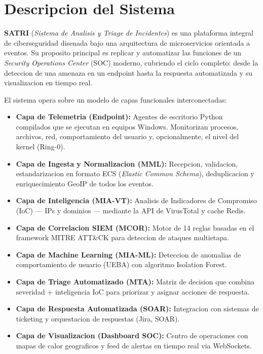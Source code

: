 \documentclass[12pt, a4paper]{report}
\begin{document}
\section{Descripcion del Sistema}

\textbf{SATRI} (\textit{Sistema de Analisis y Triage de Incidentes}) es una plataforma integral de ciberseguridad disenada bajo una arquitectura de microservicios orientada a eventos. Su proposito principal es replicar y automatizar las funciones de un \textit{Security Operations Center} (SOC) moderno, cubriendo el ciclo completo: desde la deteccion de una amenaza en un endpoint hasta la respuesta automatizada y su visualizacion en tiempo real.

El sistema opera sobre un modelo de capas funcionales interconectadas:

\begin{itemize}[leftmargin=2em]
    \item \textbf{Capa de Telemetria (Endpoint):} Agentes de escritorio Python compilados que se ejecutan en equipos Windows. Monitorizan procesos, archivos, red, comportamiento del usuario y, opcionalmente, el nivel del kernel (Ring-0).
    \item \textbf{Capa de Ingesta y Normalizacion (MML):} Recepcion, validacion, estandarizacion en formato ECS (\textit{Elastic Common Schema}), deduplicacion y enriquecimiento GeoIP de todos los eventos.
    \item \textbf{Capa de Inteligencia (MIA-VT):} Analisis de Indicadores de Compromiso (IoC) --- IPs y dominios --- mediante la API de VirusTotal y cache Redis.
    \item \textbf{Capa de Correlacion SIEM (MCOR):} Motor de 14 reglas basadas en el framework MITRE ATT\&CK para deteccion de ataques multietapa.
    \item \textbf{Capa de Machine Learning (MIA-ML):} Deteccion de anomalias de comportamiento de usuario (UEBA) con algoritmo Isolation Forest.
    \item \textbf{Capa de Triage Automatizado (MTA):} Matriz de decision que combina severidad + inteligencia IoC para priorizar y asignar acciones de respuesta.
    \item \textbf{Capa de Respuesta Automatizada (SOAR):} Integracion con sistemas de ticketing y orquestacion de respuestas (Jira, SOAR).
    \item \textbf{Capa de Visualizacion (Dashboard SOC):} Centro de operaciones con mapas de calor geograficos y feed de alertas en tiempo real via WebSockets.
\end{itemize}
\end{document}
